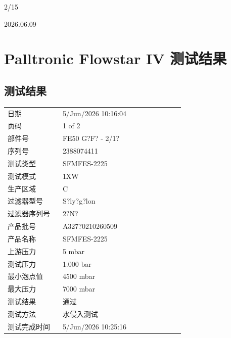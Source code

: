 \documentclass[UTF8,10pt,a4paper,fontset=fandol]{ctexart}
\newcommand{\fieldvalue}[1]{#1}
\newcommand{\handwritten}[1]{#1}
\begin{document}
\handwritten{2/15}

\handwritten{2026.06.09}

\newpage

\section{Palltronic Flowstar IV 测试结果}

\subsection{测试结果}

\begin{tabular}{@{}p{0.28\linewidth}p{0.62\linewidth}@{}}
日期 &
\fieldvalue{5/Jun/2026 10:16:04}
\\[2pt]
页码 &
\fieldvalue{1 of 2}
\\[2pt]
部件号 &
\fieldvalue{FE50 G?F? - 2/1?}
\\[2pt]
序列号 &
\fieldvalue{2388074411}
\\[2pt]
测试类型 &
\fieldvalue{SFMFES-2225}
\\[2pt]
测试模式 &
\fieldvalue{1XW}
\\[2pt]
生产区域 &
\fieldvalue{C}
\\[2pt]
过滤器型号 &
\fieldvalue{S?ly?g?lon}
\\[2pt]
过滤器序列号 &
\fieldvalue{2?N?}
\\[2pt]
产品批号 &
\fieldvalue{A327?0210260509}
\\[2pt]
产品名称 &
\fieldvalue{SFMFES-2225}
\\[2pt]
上游压力 &
\fieldvalue{5 mbar}
\\[2pt]
测试压力 &
\fieldvalue{1.000 bar}
\\[2pt]
最小泡点值 &
\fieldvalue{4500 mbar}
\\[2pt]
最大压力 &
\fieldvalue{7000 mbar}
\\[2pt]
测试结果 &
\fieldvalue{通过}
\\[2pt]
测试方法 &
\fieldvalue{水侵入测试}
\\[2pt]
测试完成时间 &
\fieldvalue{5/Jun/2026 10:25:16}
\end{tabular}
\end{document}
